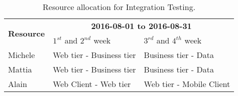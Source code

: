 \begin{table}
    \centering
    \begin{tabular}{| l | l | l |}
        \hline
        \multirow{2}{*}{\textbf{Resource}} & \multicolumn{2}{c|}{\textbf{2016-08-01 to 2016-08-31}} \\
        \cline{2-3}
        & $1^{st}$ and $2^{nd}$ week & $3^{rd}$ and $4^{th}$ week \\
        \hline
        Michele       &   Web tier - Business tier    & Business tier  - Data     \\
        Mattia        &   Web tier - Business tier    & Business tier  - Data    \\
        Alain         &   Web Client - Web tier       & Web tier - Mobile Client    \\
        \hline
    \end{tabular}
    \caption{Resource allocation for Integration Testing.}
    \label{tab:int-test-res-alloc}
\end{table}
